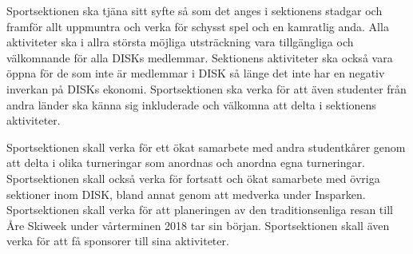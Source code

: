 \documentclass[12pt,a4paper]{article}
\begin{document}
	Sportsektionen ska tjäna sitt syfte så som det anges i sektionens stadgar och framför allt uppmuntra och verka för schysst spel och en kamratlig anda. Alla aktiviteter ska i allra största möjliga utsträckning vara tillgängliga och välkomnande för alla DISKs medlemmar. Sektionens aktiviteter ska också vara öppna för de som inte är medlemmar i DISK så länge det inte har en negativ inverkan på DISKs ekonomi. Sportsektionen ska verka för att även studenter från andra länder ska känna sig inkluderade och välkomna att delta i sektionens aktiviteter.

	Sportsektionen skall verka för ett ökat samarbete med andra studentkårer genom att delta i olika turneringar som anordnas och anordna egna turneringar. Sportsektionen skall också verka för fortsatt och ökat samarbete med övriga sektioner inom DISK, bland annat genom att medverka under Insparken. Sportsektionen skall verka för att planeringen av den traditionsenliga  resan till Åre Skiweek under vårterminen 2018 tar sin början. Sportsektionen skall även verka för att få sponsorer till sina aktiviteter.
\end{document}

